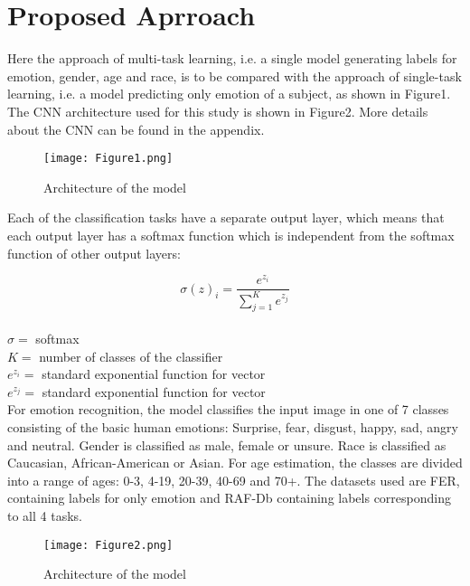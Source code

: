 \documentclass[letterpaper,10pt]{article}
\begin{document}
\section{Proposed Aprroach}
Here the approach of multi-task learning, i.e. a single model generating labels for emotion, gender, age and race, is to be compared with the approach of single-task learning, i.e. a model predicting only emotion of a subject, as shown in Figure1.
The CNN architecture used for this study is shown in Figure2. More details about the CNN can be found in the appendix.

\begin{figure}[htbp]
\centerline{\texttt{[image: Figure1.png]}}
\caption{Architecture of the model}
\label{fig}
\end{figure}

Each of the classification tasks have a separate output layer, which means that 
each output layer has a softmax function which is independent from the softmax function of other output layers:

\begin{equation}
\sigma(z)_i = \frac{e^{z_i}}{\sum_{j=1}^{K}{e^{z_j}}} 
\end{equation}
\\
$\sigma=$ softmax\\
$K=$ number of classes of the classifier\\
$e^{z_i}=$ standard exponential function for  vector\\
$e^{z_j}=$ standard exponential function for  vector\\

For emotion recognition, the model classifies the input image in one of 7 classes consisting of the basic human emotions: Surprise, fear, disgust, happy, sad, angry and neutral. Gender is classified as male, female or unsure. Race is classified as Caucasian, African-American or Asian. For age estimation, the classes are divided into a range of ages: 0-3, 4-19, 20-39, 40-69 and  70+. The datasets used are FER, containing labels for only emotion and RAF-Db containing labels corresponding to all 4 tasks.

\begin{figure}[htbp]
\centerline{\texttt{[image: Figure2.png]}}
\caption{Architecture of the model}
\label{fig}
\end{figure}
\end{document}
